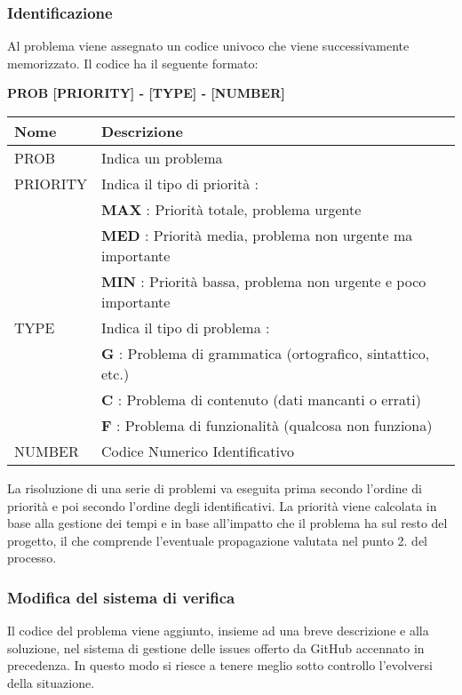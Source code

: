 \subsubsection{Identificazione}
Al problema viene assegnato un codice univoco che viene successivamente memorizzato. \newline 
Il codice ha il seguente formato: 
\begin{center}
    \textbf{PROB [PRIORITY] - [TYPE] - [NUMBER]}
\end{center}
\renewcommand{\arraystretch}{1.8} %
    \begin{tabular}{ |m{7em}|m{30em}| }
        \hline
        \textbf{Nome} & \textbf{Descrizione} \\
        \hline
            PROB & Indica un problema \\
        \hline
            PRIORITY 	& 	Indica il tipo di priorità : \\
                        &	\textbf{MAX} : Priorità totale, problema urgente \\
                        &	\textbf{MED} : Priorità media, problema non urgente ma importante \\
                        &	\textbf{MIN} : Priorità bassa, problema non urgente e poco importante \\
        \hline
                    
            TYPE 	& 	Indica il tipo di problema : \\
                    & 	\textbf{G} : Problema di grammatica (ortografico, sintattico, etc.) \\
                    &	\textbf{C} : Problema di contenuto (dati mancanti o errati) \\
                    &	\textbf{F} : Problema di funzionalità (qualcosa non funziona) \\
        \hline
            NUMBER & Codice Numerico Identificativo \\
        \hline
    \end{tabular} \newline \newline
La risoluzione di una serie di problemi va eseguita prima secondo l'ordine di priorità e poi secondo l'ordine degli identificativi. \newline 
La priorità viene calcolata in base alla gestione dei tempi e in base all'impatto che il problema ha sul resto del progetto, il che comprende l'eventuale propagazione valutata nel punto 2. del processo.
\subsubsection{Modifica del sistema di verifica}
Il codice del problema viene aggiunto, insieme ad una breve descrizione e alla soluzione, nel sistema di gestione delle issues offerto da GitHub accennato in precedenza.
In questo modo si riesce a tenere meglio sotto controllo l'evolversi della situazione.